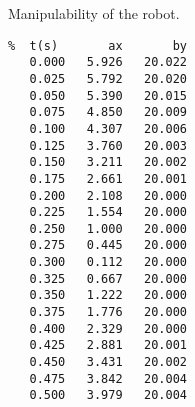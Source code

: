 Manipulability of the robot.
 \pagebreak[1]\begin{verbatim}
%  t(s)       ax       by
   0.000   5.926   20.022
   0.025   5.792   20.020
   0.050   5.390   20.015
   0.075   4.850   20.009
   0.100   4.307   20.006
   0.125   3.760   20.003
   0.150   3.211   20.002
   0.175   2.661   20.001
   0.200   2.108   20.000
   0.225   1.554   20.000
   0.250   1.000   20.000
   0.275   0.445   20.000
   0.300   0.112   20.000
   0.325   0.667   20.000
   0.350   1.222   20.000
   0.375   1.776   20.000
   0.400   2.329   20.000
   0.425   2.881   20.001
   0.450   3.431   20.002
   0.475   3.842   20.004
   0.500   3.979   20.004
\end{verbatim}
